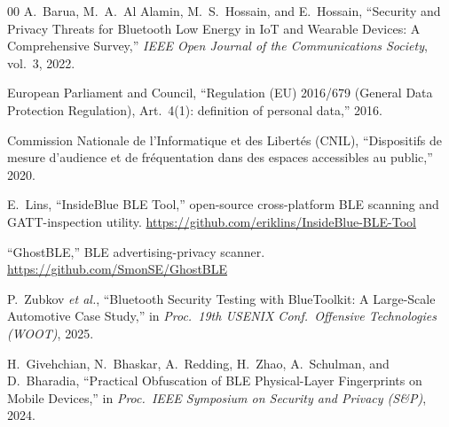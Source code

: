 \documentclass[conference]{IEEEtran}
\begin{document}
\begin{thebibliography}{00}
A.~Barua, M.~A.~Al Alamin, M.~S.~Hossain, and E.~Hossain,
``Security and Privacy Threats for Bluetooth Low Energy in IoT and
Wearable Devices: A Comprehensive Survey,''
\emph{IEEE Open Journal of the Communications Society}, vol.~3, 2022.

European Parliament and Council, ``Regulation (EU) 2016/679 (General Data
Protection Regulation), Art.~4(1): definition of personal data,'' 2016.

Commission Nationale de l'Informatique et des Libert\'es (CNIL),
``Dispositifs de mesure d'audience et de fr\'equentation dans des espaces
accessibles au public,'' 2020.

E.~Lins, ``InsideBlue BLE Tool,'' open-source cross-platform BLE
scanning and GATT-inspection utility.
\url{https://github.com/eriklins/InsideBlue-BLE-Tool}

``GhostBLE,'' BLE advertising-privacy scanner.
\url{https://github.com/SmonSE/GhostBLE}

P.~Zubkov \emph{et al.},
``Bluetooth Security Testing with BlueToolkit: A Large-Scale Automotive
Case Study,''
in \emph{Proc.\ 19th USENIX Conf.\ Offensive Technologies (WOOT)}, 2025.

H.~Givehchian, N.~Bhaskar, A.~Redding, H.~Zhao, A.~Schulman, and
D.~Bharadia,
``Practical Obfuscation of BLE Physical-Layer Fingerprints on Mobile
Devices,''
in \emph{Proc.\ IEEE Symposium on Security and Privacy (S\&P)}, 2024.

\end{thebibliography}
\end{document}
